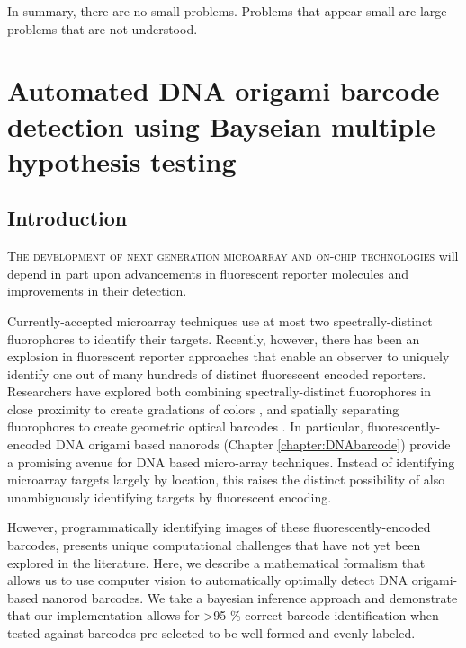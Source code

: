 %
\begin{savequote}[75mm] 
In summary, there are no small problems. Problems that appear small are large problems that are not understood.
\end{savequote}

\chapter{Automated DNA origami barcode detection using Bayseian multiple hypothesis testing} \label{chapter:DNAtheory}

\section{Introduction}
\lettrine{T}{he development of next generation microarray and on-chip technologies} will depend in part upon advancements in fluorescent reporter molecules and improvements in their detection.

Currently-accepted microarray techniques  use at most two spectrally-distinct fluorophores to identify their targets.  Recently, however, there has been an explosion in fluorescent reporter approaches that enable an observer to uniquely identify one out of many hundreds of distinct fluorescent encoded reporters. Researchers have explored both combining spectrally-distinct fluorophores in close proximity to create gradations of colors \citep{han_quantum-dot-tagged_2001,xu_multiplexed_2003,li_multiplexed_2005,livet_transgenic_2007,fournier-bidoz_facile_2008,lin_self-assembled_2007,marcon_--fly_2010}, and spatially separating fluorophores to create geometric optical barcodes \citep{nicewarner-pena_submicrometer_2001,gudiksen_growth_2002,braeckmans_encoding_2003,dejneka_rare_2003,geiss_direct_2008,pregibon_multifunctional_2007,xiao_direct_2009,li_controlled_2010}. In particular, fluorescently-encoded DNA origami \citep{rothemund_folding_2006, douglas_self-assembly_2009} based nanorods (Chapter \ref{chapter:DNAbarcode}) provide a promising avenue for DNA based micro-array techniques. Instead of identifying microarray targets largely by location, this raises the distinct possibility of also unambiguously identifying targets by fluorescent encoding. 

However, programmatically identifying images of these fluorescently-encoded barcodes, presents unique computational challenges that have not yet been explored in the literature.  Here, we describe a mathematical formalism that allows us to use computer vision to automatically optimally detect DNA origami-based nanorod barcodes. We take a bayesian inference approach and demonstrate that our implementation allows for >95 \% correct barcode identification when tested against barcodes pre-selected to be well formed and evenly labeled. 

